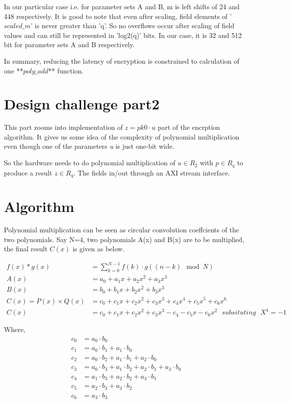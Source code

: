 \documentclass{article}
\begin{document}
    In our particular case i.e. for parameter sets A and B, m is left shifts of 24 and 448 respectively. 
    It is good to note that even after scaling, field elements of '$scaled\_m$' is never greater than 'q'. So no overflows occur after scaling of field values and can still be represented in 'log2(q)' bits. In our case, it is 32 and 512 bit for parameter sets A and B respectively.
    
    In summary, reducing the latency of encryption is constrained to calculation of one **$poly\_add$** function.
    

    \section{Design challenge part2}
    This part zooms into implementation of $z = pk0 \cdot u$ part of the encrption algorithm. It gives us some idea of the complexity of polynomial
    multiplication even though one of the parameters \textit{u} is just one-bit wide.

    So the hardware needs to do polynomial multiplication of $u \in R_2$ with  $p \in R_q$ to produce a result  $z \in R_q$.
    The fields in/out through an AXI stream interface. 

    \section{Algorithm}
    Polynomial multiplication can be seen as circular convolution coeffcients of the two polynomials. 
    Say N=4, two polynomials  A(x) and B(x) are to be multiplied, the final result $C(x)$ is given as below.

    \begin{align}
      f(x) \ast g(x) &= \sum_{k=0}^{N-1} f(k) \cdot g((n-k) \mod N) \\
      A(x) &= a_0 + a_1x + a_2x^2 + a_3x^3 \\
      B(x) &= b_0 + b_1x + b_2x^2 + b_3x^3 \\
      C(x) = P(x) \times Q(x) &= c_0 + c_1x + c_2x^2 + c_3x^3 + c_4x^4 + c_5x^5 + c_6x^6 \\
      C(x) &= c_0 + c_1x + c_2x^2 + c_3x^3 - c_4 - c_5x - c_6x^2\ \ \   subsituting\ \ \ X^4 = -1 
    \end{align}

    Where,
    \begin{align}
      c_0 &= a_0 \cdot b_0 \\
      c_1 &= a_0 \cdot b_1 + a_1 \cdot b_0 \\
      c_2 &= a_0 \cdot b_2 + a_1 \cdot b_1 + a_2 \cdot b_0 \\
      c_3 &= a_0 \cdot b_3 + a_1 \cdot b_2 + a_2 \cdot b_1 + a_3 \cdot b_0 \\
      c_4 &= a_1 \cdot b_3 + a_2 \cdot b_2 + a_3 \cdot b_1 \\
      c_5 &= a_2 \cdot b_3 + a_3 \cdot b_2 \\
      c_6 &= a_3 \cdot b_3 \\
    \end{align} 
    
\end{document}
